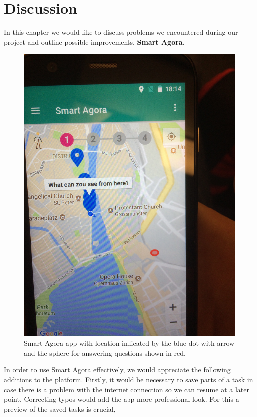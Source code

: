 \documentclass[letterpaper]{article}
\newcommand{\mypar}[1]{{\bf #1.}}
\begin{document}
\section{Discussion}\label{sec:discussion}
In this chapter we would like to discuss problems we encountered during our project and outline possible improvements.
\mypar{Smart Agora}
\begin{figure}[htb]
    \centering
    \includegraphics[width=\columnwidth, rotate=270]{images/SmartAgora/img_6.jpg}
    \caption{Smart Agora app with location indicated by the blue dot with arrow and the sphere for answering questions shown in red.}
    \label{fig:smart_agora_1}
\end{figure}
In order to use Smart Agora effectively, we would appreciate the following additions to the platform. Firstly,
it would be necessary to save parts of a task in case there is a problem with the internet connection
so we can resume at a later point. Correcting typos would add the app more professional look. For this a preview of the saved tasks is crucial,
\end{document}
